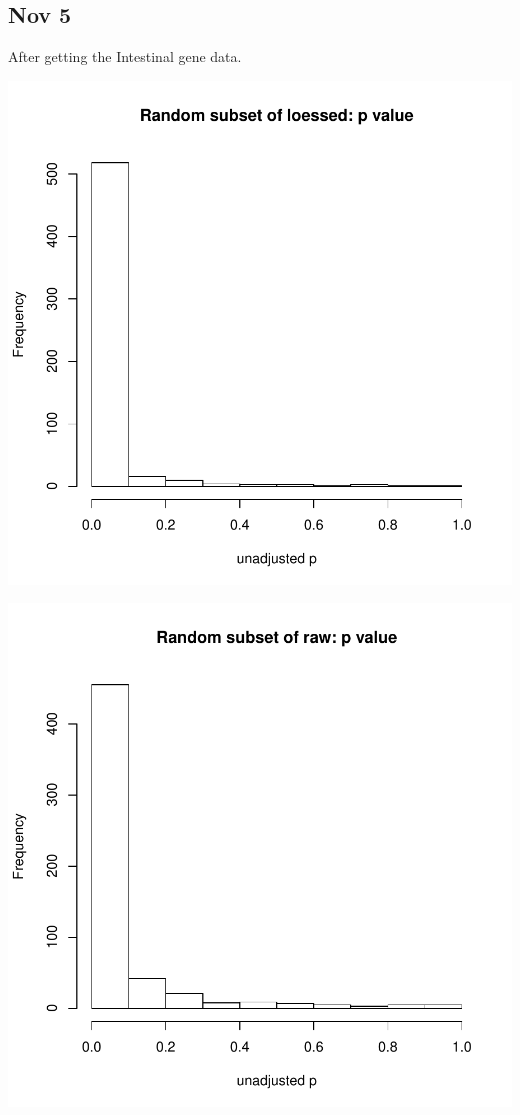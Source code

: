 \documentclass{article}\usepackage[]{graphicx}\usepackage[]{color}
\makeatletter
\def\maxwidth{ %
  \ifdim\Gin@nat@width>\linewidth
    \linewidth
  \else
    \Gin@nat@width
  \fi
}
\makeatother
\begin{document}
  \subsection{Nov 5}
  After getting the Intestinal gene data.
\begin{Schunk}


{\centering \includegraphics[width=\maxwidth]{figure/Nov_5-1} 

}



{\centering \includegraphics[width=\maxwidth]{figure/Nov_5-2} 

}

\end{Schunk}
\end{document}
